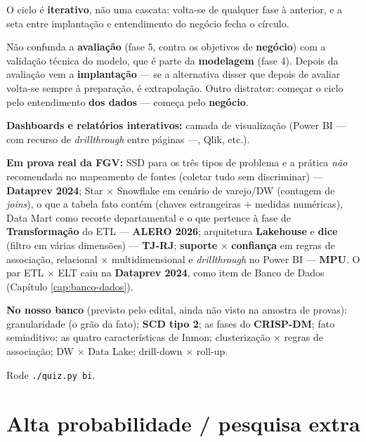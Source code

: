 O ciclo é \textbf{iterativo}, não uma cascata: volta-se de qualquer fase à
anterior, e a seta entre implantação e entendimento do negócio fecha o
círculo.

\begin{pegadinha}
Não confunda a \textbf{avaliação} (fase 5, contra os objetivos de
\textbf{negócio}) com a validação técnica do modelo, que é parte da
\textbf{modelagem} (fase 4). Depois da avaliação vem a \textbf{implantação}
--- se a alternativa disser que depois de avaliar volta-se sempre à
preparação, é extrapolação. Outro distrator: começar o ciclo pelo
entendimento \textbf{dos dados} --- começa pelo \textbf{negócio}.
\end{pegadinha}

\textbf{Dashboards e relatórios interativos:} camada de visualização (Power
BI --- com recurso de \textit{drillthrough} entre páginas ---, Qlik, etc.).

\begin{jacaiu}
\textbf{Em prova real da FGV:} SSD para os três tipos de problema e a prática
\emph{não} recomendada no mapeamento de fontes (coletar tudo sem
discriminar) --- \textbf{Dataprev 2024}; Star $\times$ Snowflake em cenário
de varejo/DW (contagem de \textit{joins}), o que a tabela fato contém
(chaves estrangeiras + medidas numéricas), Data Mart como recorte
departamental e o que pertence à fase de \textbf{Transformação} do ETL ---
\textbf{ALERO 2026}; arquitetura \textbf{Lakehouse} e \textbf{dice} (filtro
em várias dimensões) --- \textbf{TJ-RJ}; \textbf{suporte} $\times$
\textbf{confiança} em regras de associação, relacional $\times$
multidimensional e \textit{drillthrough} no Power BI --- \textbf{MPU}. O par
ETL $\times$ ELT caiu na \textbf{Dataprev 2024}, como item de Banco de Dados
(Capítulo \ref{cap:banco-dados}).

\textbf{No nosso banco} (previsto pelo edital, ainda não visto na amostra de
provas): granularidade (o grão da fato); \textbf{SCD tipo 2}; as fases do
\textbf{CRISP-DM}; fato semiaditivo; as quatro características de Inmon;
clusterização $\times$ regras de associação; DW $\times$ Data Lake;
drill-down $\times$ roll-up.

Rode \texttt{./quiz.py bi}.
\end{jacaiu}

\section{Alta probabilidade / pesquisa extra}

